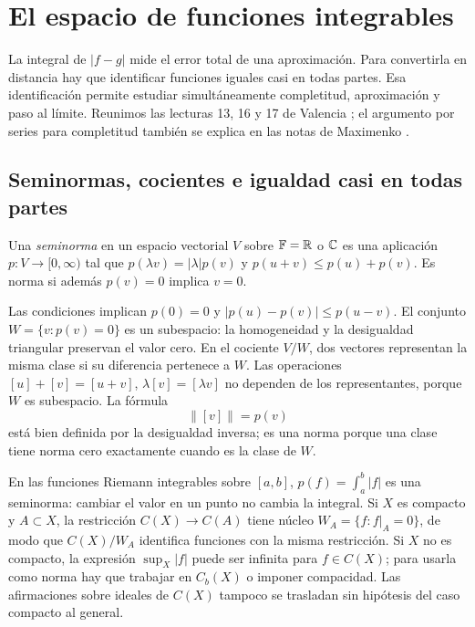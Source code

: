 \chapter{El espacio de funciones integrables}\label{cap:v2-08}

La integral de $|f-g|$ mide el error total de una aproximación. Para convertirla en distancia hay que identificar funciones iguales casi en todas partes. Esa identificación permite estudiar simultáneamente completitud, aproximación y paso al límite. Reunimos las lecturas 13, 16 y 17 de Valencia \cite{valencia2}; el argumento por series para completitud también se explica en las notas de Maximenko \cite{maximenkoLp}.

\section{Seminormas, cocientes e igualdad casi en todas partes}\label{lectura:v2-13}
\begin{definicion}
Una \emph{seminorma} en un espacio vectorial $V$ sobre $\mathbb F=\mathbb R$ o $\mathbb C$ es una aplicación $p:V\to[0,\infty)$ tal que $p(\lambda v)=|\lambda|p(v)$ y $p(u+v)\le p(u)+p(v)$. Es norma si además $p(v)=0$ implica $v=0$.
\end{definicion}
Las condiciones implican $p(0)=0$ y $|p(u)-p(v)|\le p(u-v)$. El conjunto $W=\{v:p(v)=0\}$ es un subespacio: la homogeneidad y la desigualdad triangular preservan el valor cero. En el cociente $V/W$, dos vectores representan la misma clase si su diferencia pertenece a $W$. Las operaciones $[u]+[v]=[u+v]$, $\lambda[v]=[\lambda v]$ no dependen de los representantes, porque $W$ es subespacio. La fórmula
\[\|[v]\|=p(v)
\]
está bien definida por la desigualdad inversa; es una norma porque una clase tiene norma cero exactamente cuando es la clase de $W$.

\begin{ejemplo}
En las funciones Riemann integrables sobre $[a,b]$, $p(f)=\int_a^b|f|$ es una seminorma: cambiar el valor en un punto no cambia la integral. Si $X$ es compacto y $A\subset X$, la restricción $C(X)\to C(A)$ tiene núcleo $W_A=\{f:f|_A=0\}$, de modo que $C(X)/W_A$ identifica funciones con la misma restricción. Si $X$ no es compacto, la expresión $\sup_X|f|$ puede ser infinita para $f\in C(X)$; para usarla como norma hay que trabajar en $C_b(X)$ o imponer compacidad. Las afirmaciones sobre ideales de $C(X)$ tampoco se trasladan sin hipótesis del caso compacto al general.
\end{ejemplo}

